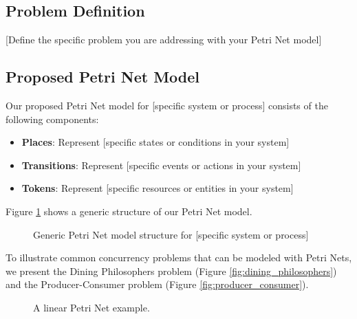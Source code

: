 \label{sec:methodology}

\subsection{Problem Definition}

[Define the specific problem you are addressing with your Petri Net model]

\subsection{Proposed Petri Net Model}

Our proposed Petri Net model for [specific system or process] consists of the following components:

\begin{itemize}
    \item \textbf{Places}: Represent [specific states or conditions in your system]
    \item \textbf{Transitions}: Represent [specific events or actions in your system]
    \item \textbf{Tokens}: Represent [specific resources or entities in your system]
\end{itemize}

Figure \ref{fig:petri_net_generic_model} shows a generic structure of our Petri Net model.
\begin{figure}[htbp]
\centering

\caption{Generic Petri Net model structure for [specific system or process]}
\label{fig:petri_net_generic_model} %
\end{figure}

To illustrate common concurrency problems that can be modeled with Petri Nets, we present the Dining Philosophers problem (Figure \ref{fig:dining_philosophers}) and the Producer-Consumer problem (Figure \ref{fig:producer_consumer}).

\begin{figure*}[htbp]
\centering

\caption{Petri Net model of the Dining Philosophers problem}
\label{fig:dining_philosophers}
\end{figure*}

\begin{figure}[htbp]
\centering

\caption{A linear Petri Net example.}
\label{fig:linear_petri_net}
\end{figure}

